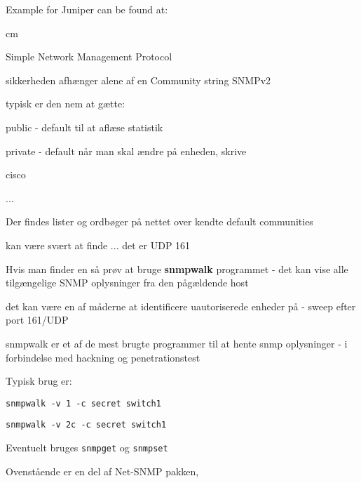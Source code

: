 \documentclass[Screen16to9,17pt]{foils}
\begin{document}
Example for Juniper can be found at:\\
{\small{}}


 cm

\begin{list1}
\item Simple Network Management Protocol
\item sikkerheden afhænger alene af en Community string SNMPv2
\item typisk er den nem at gætte:
  \begin{list2}
    \item public - default til at aflæse statistik
\item private - default når man skal ændre på enheden, skrive
\item cisco
\item ...
  \end{list2}
\item Der findes lister og ordbøger på nettet over kendte default communities
\end{list1}


\begin{list1}
  \item kan være svært at finde ... det er UDP 161
\item Hvis man finder en så prøv at bruge {\bfseries snmpwalk}
  programmet - det kan vise alle tilgængelige SNMP oplysninger fra den
  pågældende host
\item det kan være en af måderne at identificere uautoriserede enheder på - sweep efter port 161/UDP
\item snmpwalk er et af de mest brugte programmer til at hente snmp
  oplysninger - i forbindelse med hackning og penetrationstest
\end{list1}


\begin{list1}
\item Typisk brug er:
\item \verb+snmpwalk -v 1 -c secret switch1+
\item \verb+snmpwalk -v 2c -c secret switch1+
\item Eventuelt bruges \verb+snmpget+ og \verb+snmpset+
\item Ovenstående er en del af Net-SNMP pakken, 
\end{list1}
\end{document}
